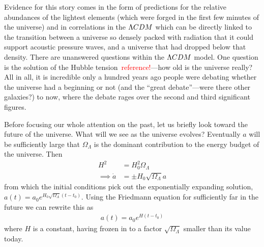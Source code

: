     Evidence for this story comes in the form of predictions for the relative abundances of the lightest
    elements (which were forged in the first few minutes of the universe) and in correlations in the $\Lambda CDM$
    which can be directly linked to the transition between a universe so densely packed with radiation that it could
    support acoustic pressure waves, and a universe that had dropped below that density.
    There are unanswered questions within the $\Lambda CDM$ model.
    One question is the solution of the Hubble tension~\textcolor{red}{reference!}---how old is the universe really?
    All in all, it is incredible only a hundred years ago people were debating whether the universe had a beginning or not
    (and the ``great debate''---were there other galaxies?) to now, where the debate rages over the second and
    third significant figures.


    Before focusing our whole attention on the past, let us briefly
    look toward the future of the universe.
    What will we see as the universe evolves?
    Eventually $a$ will be
    sufficiently large that $\Omega_{\Lambda}$
    is the dominant contribution to the energy budget of the universe.
    Then
    \begin{align}
        H^2 &= H_0^2\Omega_{\Lambda}\\
        \implies \dot{a} &= \pm H_0\sqrt{\Omega_{\Lambda}}a
    \end{align}
    from which the initial conditions pick out the exponentially expanding solution,\\
    ${a(t)=a_0e^{H_0\sqrt{\Omega_{\Lambda}}\left(t-t_0\right)}}$. Using the Friedmann equation
    for sufficiently far in the future we can rewrite this as
    \begin{align}
        a(t)=a_0e^{H\left(t-t_0\right)}
    \end{align}
    where $H$ is a constant, having frozen in to a factor $\sqrt{\Omega_{\Lambda}}$ smaller than
    its value today.


